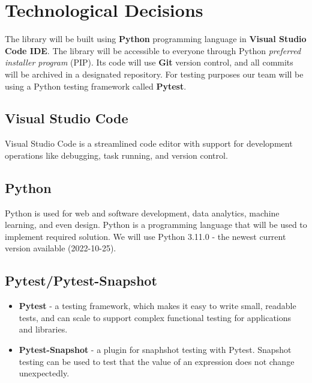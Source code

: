 \documentclass[a4paper,12pt,fleqn]{article}
\begin{document}
\newpage
\section{Technological Decisions}
The library will be built using \textbf{Python} programming language in \textbf{Visual Studio Code IDE}. The library will be accessible to everyone through Python \textit{preferred installer program} (PIP). Its code will use \textbf{Git} version control, and all commits will be archived in a designated repository.\newline
For testing purposes our team will be using a Python testing framework called \textbf{Pytest}. 

\subsection{Visual Studio Code}
Visual Studio Code is a streamlined code editor with support for development operations like debugging, task running, and version control.

\subsection{Python}
Python is used for web and software development, data analytics, machine learning, and even design. Python is a programming language that will be used to implement required solution. We will use Python 3.11.0 - the newest current version available (2022-10-25).

\subsection{Pytest/Pytest-Snapshot}


\begin{itemize}
    \item \textbf{Pytest} - a testing framework, which makes it easy to write small, readable tests, and can scale to support complex functional testing for applications and libraries.
    \item \textbf{Pytest-Snapshot} - a plugin for snaphshot testing with Pytest.
    Snapshot testing can be used to test that the value of an expression does not change unexpectedly.
\end{itemize}
\end{document}
